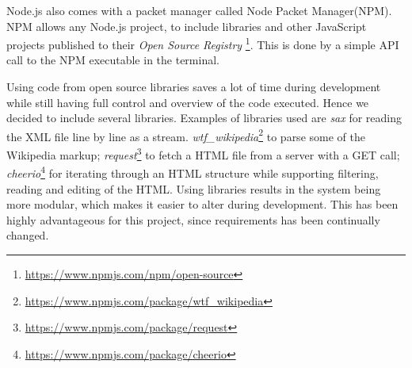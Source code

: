 Node.js also comes with a packet manager called Node Packet Manager(NPM). NPM allows any Node.js project, to include libraries and other JavaScript projects published to their \textit{Open Source Registry} \footnote{\url{https://www.npmjs.com/npm/open-source}}. This is done by a simple API call to the NPM executable in the terminal.

Using code from open source libraries saves a lot of time during development while still having full control and overview of the code executed. Hence we decided to include several libraries. Examples of libraries used are \textit{sax} for reading the XML file line by line as a stream.  \textit{wtf\_wikipedia}\footnote{\url{https://www.npmjs.com/package/wtf_wikipedia}} to parse some of the Wikipedia markup;  \textit{request}\footnote{\url{https://www.npmjs.com/package/request}} to fetch a HTML file from a server with a GET call;  \textit{cheerio}\footnote{\url{https://www.npmjs.com/package/cheerio}} for iterating through an HTML structure while supporting filtering, reading and editing of the HTML. Using libraries results in the system being more modular, which makes it easier to alter during development. This has been highly advantageous for this project, since requirements has been continually changed. 


\cleardoublepage